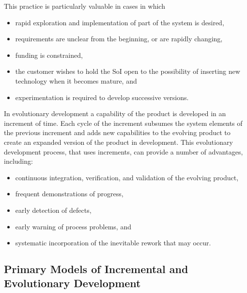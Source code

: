 \documentclass[letterpaper,10pt,english]{jupyterBook}
\begin{document}
\sphinxAtStartPar
This practice is particularly valuable in cases in which
\begin{itemize}
\item {} 
\sphinxAtStartPar
rapid exploration and implementation of part of the system is desired,

\item {} 
\sphinxAtStartPar
requirements are unclear from the beginning, or are rapidly changing,

\item {} 
\sphinxAtStartPar
funding is constrained,

\item {} 
\sphinxAtStartPar
the customer wishes to hold the SoI open to the possibility of inserting new technology when it becomes mature, and

\item {} 
\sphinxAtStartPar
experimentation is required to develop successive versions.

\end{itemize}

\sphinxAtStartPar
In evolutionary development a capability of the product is developed in an increment of time.
Each cycle of the increment subsumes the system elements of the previous increment and adds new capabilities to the evolving product to create an expanded version of the product in development.
This evolutionary development process, that uses increments, can provide a number of advantages, including:
\begin{itemize}
\item {} 
\sphinxAtStartPar
continuous integration, verification, and validation of the evolving product,

\item {} 
\sphinxAtStartPar
frequent demonstrations of progress,

\item {} 
\sphinxAtStartPar
early detection of defects,

\item {} 
\sphinxAtStartPar
early warning of process problems, and

\item {} 
\sphinxAtStartPar
systematic incorporation of the inevitable rework that may occur.

\end{itemize}


\subsection{Primary Models of Incremental and Evolutionary Development}
\label{\detokenize{SE/sebok:primary-models-of-incremental-and-evolutionary-development}}
\end{document}
